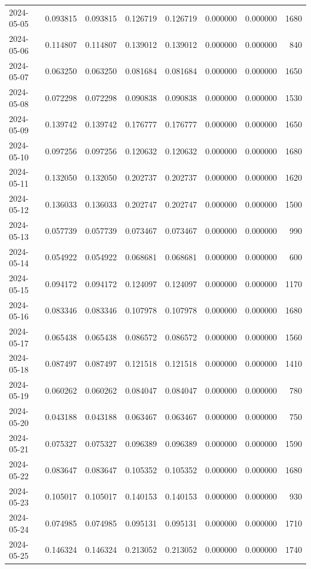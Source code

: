 \begin{tabular}{lrrrrrrr}
2024-05-05 & 0.093815 & 0.093815 & 0.126719 & 0.126719 & 0.000000 & 0.000000 & 1680 \\
2024-05-06 & 0.114807 & 0.114807 & 0.139012 & 0.139012 & 0.000000 & 0.000000 & 840 \\
2024-05-07 & 0.063250 & 0.063250 & 0.081684 & 0.081684 & 0.000000 & 0.000000 & 1650 \\
2024-05-08 & 0.072298 & 0.072298 & 0.090838 & 0.090838 & 0.000000 & 0.000000 & 1530 \\
2024-05-09 & 0.139742 & 0.139742 & 0.176777 & 0.176777 & 0.000000 & 0.000000 & 1650 \\
2024-05-10 & 0.097256 & 0.097256 & 0.120632 & 0.120632 & 0.000000 & 0.000000 & 1680 \\
2024-05-11 & 0.132050 & 0.132050 & 0.202737 & 0.202737 & 0.000000 & 0.000000 & 1620 \\
2024-05-12 & 0.136033 & 0.136033 & 0.202747 & 0.202747 & 0.000000 & 0.000000 & 1500 \\
2024-05-13 & 0.057739 & 0.057739 & 0.073467 & 0.073467 & 0.000000 & 0.000000 & 990 \\
2024-05-14 & 0.054922 & 0.054922 & 0.068681 & 0.068681 & 0.000000 & 0.000000 & 600 \\
2024-05-15 & 0.094172 & 0.094172 & 0.124097 & 0.124097 & 0.000000 & 0.000000 & 1170 \\
2024-05-16 & 0.083346 & 0.083346 & 0.107978 & 0.107978 & 0.000000 & 0.000000 & 1680 \\
2024-05-17 & 0.065438 & 0.065438 & 0.086572 & 0.086572 & 0.000000 & 0.000000 & 1560 \\
2024-05-18 & 0.087497 & 0.087497 & 0.121518 & 0.121518 & 0.000000 & 0.000000 & 1410 \\
2024-05-19 & 0.060262 & 0.060262 & 0.084047 & 0.084047 & 0.000000 & 0.000000 & 780 \\
2024-05-20 & 0.043188 & 0.043188 & 0.063467 & 0.063467 & 0.000000 & 0.000000 & 750 \\
2024-05-21 & 0.075327 & 0.075327 & 0.096389 & 0.096389 & 0.000000 & 0.000000 & 1590 \\
2024-05-22 & 0.083647 & 0.083647 & 0.105352 & 0.105352 & 0.000000 & 0.000000 & 1680 \\
2024-05-23 & 0.105017 & 0.105017 & 0.140153 & 0.140153 & 0.000000 & 0.000000 & 930 \\
2024-05-24 & 0.074985 & 0.074985 & 0.095131 & 0.095131 & 0.000000 & 0.000000 & 1710 \\
2024-05-25 & 0.146324 & 0.146324 & 0.213052 & 0.213052 & 0.000000 & 0.000000 & 1740 \\

\end{tabular}
